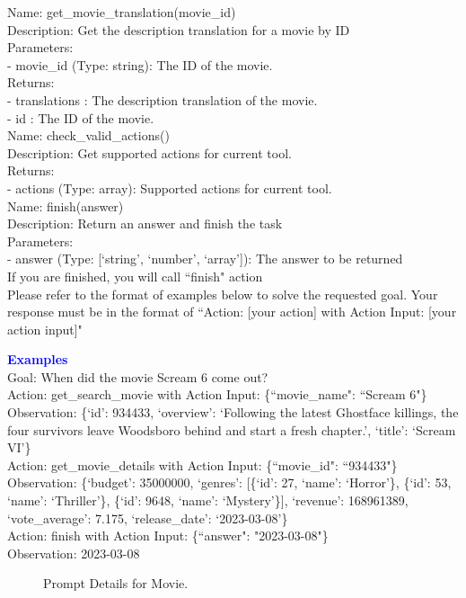 \begin{tcolorbox}[breakable,title=Prompt Details for Movie]
Name: get\_movie\_translation(movie\_id)\\
Description: Get the description translation for a movie by ID\\
Parameters:\\
- movie\_id (Type: string): The ID of the movie.\\
Returns:\\
- translations : The description translation of the movie.\\
- id : The ID of the movie.\\

Name: check\_valid\_actions()\\
Description: Get supported actions for current tool.\\
Returns:\\
- actions (Type: array): Supported actions for current tool.\\

Name: finish(answer)\\
Description: Return an answer and finish the task\\
Parameters:\\
- answer (Type: [`string', `number', `array']): The answer to be returned\\

If you are finished, you will call ``finish" action\\
Please refer to the format of examples below to solve the requested goal. Your response must be in the format of ``Action: [your action] with Action Input: [your action input]"
\textbf{\textcolor{blue}{Examples}}\\
Goal: When did the movie Scream 6 come out?\\

Action: get\_search\_movie with Action Input: \{``movie\_name": ``Scream 6"\}\\
Observation: \{`id': 934433, `overview': `Following the latest Ghostface killings, the four survivors leave Woodsboro behind and start a fresh chapter.', `title': `Scream VI'\}\\
Action: get\_movie\_details with Action Input: \{``movie\_id": ``934433"\}\\
Observation: \{`budget': 35000000, `genres': [\{`id': 27, `name': `Horror'\}, \{`id': 53, `name': `Thriller'\}, \{`id': 9648, `name': `Mystery'\}], `revenue': 168961389, `vote\_average': 7.175, `release\_date': `2023-03-08'\}\\
Action: finish with Action Input: \{``answer": "2023-03-08"\}\\
Observation: 2023-03-08
\end{tcolorbox}
\begin{figure}[!h]
    \vspace{-0.08cm}
    \caption{Prompt Details for Movie.}
    \label{fig:movie_prompt}
\end{figure}